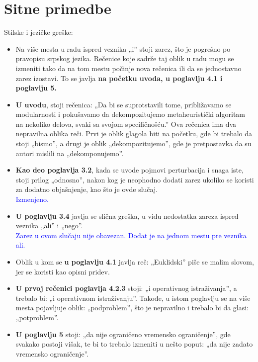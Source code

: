 \documentclass[a4paper]{report}
\newcommand{\odgovor}[1]{\textcolor{blue}{#1}}
\begin{document}
\section{Sitne primedbe}
Stilske i jezičke greške:
\begin{itemize}
 \item Na više mesta u radu ispred veznika „i” stoji zarez, što je pogrešno po pravopisu srpskog jezika. Rečenice koje sadrže taj oblik u radu mogu se izmeniti tako da na tom mestu počinje nova rečenica ili da se jednostavno zarez izostavi. To se javlja \textbf{na početku uvoda, u poglavlju 4.1 i poglavlju 5.}
 
 \item \textbf{U uvodu}, stoji rečenica: „Da bi se suprotstavili tome, približavamo se modularnosti i pokušavamo da dekompozitujemo metaheuristički algoritam na nekoliko delova, svaki sa svojom specifičnošću.” Ova rečenica ima dva nepravilna oblika reči. Prvi je oblik glagola biti na početku, gde bi trebalo da stoji „bismo”, a drugi je oblik „dekompozitujemo”, gde je pretpostavka da su autori mislili na „dekomponujemo”.
 
 \item \textbf{Kao deo poglavlja 3.2}, kada se uvode pojmovi perturbacija i snaga iste, stoji prilog „odnosno”, nakon kog je neophodno dodati zarez ukoliko se koristi za dodatno objašnjenje, kao što je ovde slučaj.\\
 \odgovor{Izmenjeno.\\}
 
 \item \textbf{U poglavlju 3.4} javlja se slična greška, u vidu nedostatka zareza ispred veznika „ali” i „nego”.\\
 \odgovor{Zarez u ovom slučaju nije obavezan. Dodat je na jednom mestu pre veznika ali.\\}
 
 \item Oblik u kom se \textbf{u poglavlju 4.1} javlja reč: „Euklidski” piše se malim slovom, jer se koristi kao opisni pridev.
 
 \item \textbf{U prvoj rečenici poglavlja 4.2.3} stoji: „i operativnog istraživanja”, a trebalo bi: „i operativnom istraživanju”. Takođe, u istom poglavlju se na više mesta pojavljuje oblik: „podproblem”, što je nepravilno i trebalo bi da glasi: „potproblem”.
 
 \item \textbf{U poglavlju 5} stoji: „da nije ograničeno vremensko ograničenje”, gde svakako postoji višak, te bi to trebalo izmeniti u nešto poput: „da nije zadato vremensko ograničenje”.
\end{itemize}
\end{document}

